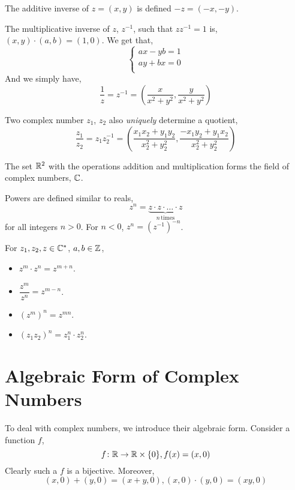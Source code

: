 The additive inverse of \(z = (x, y)\) is defined \(-z = (-x, -y)\). 

The multiplicative inverse of \(z\), \(z^{-1}\), such that \(zz^{-1} = 1\) is,
\((x,y) \cdot (a,b) = (1, 0)\). We get that,
\[
    \begin{cases}
        ax - yb = 1 \\
        ay + bx = 0 \\
    \end{cases}\] 
 And we simply have,
 \[
    \frac{1}{z} = z^{-1} = \left(\frac{x}{x^2 + y^2}, \frac{y}{x^2 + y^2} \right)
\]

Two complex number \(z_1\), \(z_2\) also \emph{uniquely} determine a quotient,
\[\frac{z_1}{z_2} = z_1z_{2}^{-1} = \left(\frac{x_1x_2 + y_1y_2}{x_{2}^{2} + y_{2}^{2}},
\frac{-x_1y_2 + y_1x_2}{x_{2}^{2} + y_{2}^{2}} \right)\]

The set \(\mathbb R^2\) with the operations addition and multiplication forms the field of 
complex numbers, \(\mathbb C\). 

Powers are defined similar to reals,
\[
    z^n = \underbrace{z\cdot z \cdot \dots \cdot z}_{n \, \text{times}}\]%
for all integers \(n > 0\). For \(n < 0\), \(z^{n} = (z^{-1})^{-n}\). 


\begin{proposition}
    For \(z_1, z_2, z \in \mathbb C^*\), \(a, b \in \mathbb Z\),
    \begin{itemize}
        \item \(z^m \cdot z^n = z^{m + n}\).
        \item \(\dfrac{z^m}{z^n} = z^{m-n}\).
        \item \((z^m)^n = z^{mn}\).
        \item \((z_1z_2)^n = z_{1}^n \cdot z_{2}^n\).
    \end{itemize}
\end{proposition}

\section{Algebraic Form of Complex Numbers}

To deal with complex numbers, we introduce their algebraic form. 
Consider a function \(f\),
\[
    f \colon \mathbb R \to \mathbb R \times \{0\}, f(x) = (x, 0)\]%
Clearly such a \(f\) is a bijective. Moreover, 
\[(x, 0) + (y, 0) = (x + y, 0), (x,0) \cdot (y, 0) = (xy, 0)\]

